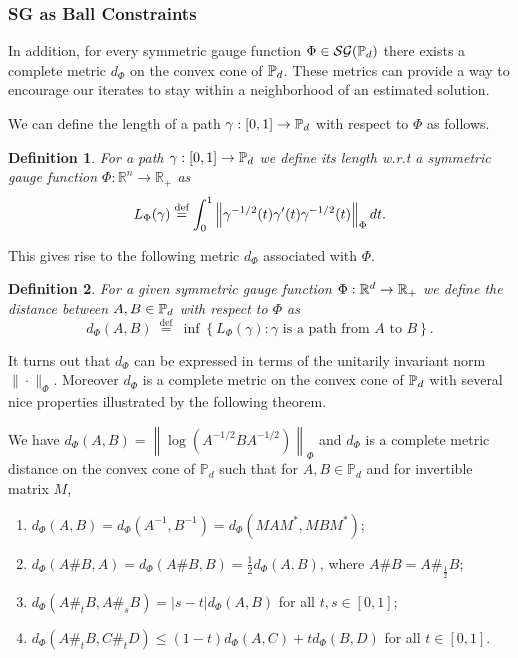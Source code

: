 \documentclass[sn-nature]{sn-jnl}%
\theoremstyle{thmstyleone}%
\newtheorem{defn}{Definition}
\theoremstyle{thmstyletwo}%
\theoremstyle{thmstylethree}%
\begin{document}
\subsubsection{SG as Ball Constraints}\label{sec:SG_Ball_Constraints}
In addition, for every symmetric gauge function $\Phi \in \mathcal{SG}(\mathbb{P}_d)$ there exists a complete metric $d_\Phi$ on the convex cone of $\mathbb{P}_d$. These metrics can provide a way to encourage our iterates to stay within a neighborhood of an estimated solution.


We can define the length of a path $\gamma:[0,1] \to \mathbb{P}_d$ with respect to $\Phi$ as follows. 


    \begin{defn}
        For a path $\gamma:[0,1] \rightarrow \mathbb{P}_d$ we define its length w.r.t a symmetric gauge function $\Phi: \mathbb{R}^n \rightarrow \mathbb{R}_{+}$ as
$$
L_{\Phi}(\gamma) \stackrel{\text{def}}{=} \int_0^1\left\|\gamma^{-1 / 2}(t) \gamma^{\prime}(t) \gamma^{-1 / 2}(t)\right\|_{\Phi} d t .
$$
    \end{defn}


This gives rise to the following metric $d_\Phi$ associated with $\Phi$. 


    \begin{defn}
        For a given symmetric gauge function $\Phi: \mathbb{R}^d  \rightarrow \mathbb{R}_+$ we define the distance between $A, B \in \mathbb{P}_d$ with respect to $\Phi$ as
$$
d_{\Phi}(A, B) \stackrel{\text { def }}{=} \inf \left\{L_{\Phi}(\gamma): \gamma \text { is a path from } A \text { to } B\right\}.
$$
    \end{defn}


It turns out that $d_\Phi$ can be expressed in terms of the unitarily invariant norm $\|\cdot\|_\Phi$. Moreover $d_\Phi$ is a complete metric on the convex cone of $\mathbb{P}_d$ with several nice properties illustrated by the following theorem.


    \begin{theorem}\label{theorem:dphi_properties}
     We have $d_{\Phi}(A, B)=\left\|\log \left(A^{-1 / 2} B A^{-1 / 2}\right)\right\|_{\Phi}$ and $d_{\Phi}$ is a complete metric distance on the convex cone of $\mathbb{P}_d$ such that for $A, B \in \mathbb{P}_d$ and for invertible matrix $M$,
\begin{enumerate}
    \item $d_{\Phi}(A, B)=d_{\Phi}\left(A^{-1}, B^{-1}\right)=d_{\Phi}\left(M A M^*, M B M^*\right)$;
    \item $d_{\Phi}(A \# B, A)=d_{\Phi}(A \# B, B)=\frac{1}{2} d_{\Phi}(A, B)$, where $A \# B=A \#_{\frac{1}{2}} B$;
    \item $d_{\Phi}\left(A \#_t B, A \#_s B\right)=|s-t| d_{\Phi}(A, B)$ for all $t, s \in[0,1]$;
    \item $d_{\Phi}\left(A \#_t B, C \#_t D\right) \leq(1-t) d_{\Phi}(A, C)+t d_{\Phi}(B, D)$ for all $t \in[0,1]$.
\end{enumerate}
    \end{theorem}
\end{document}
